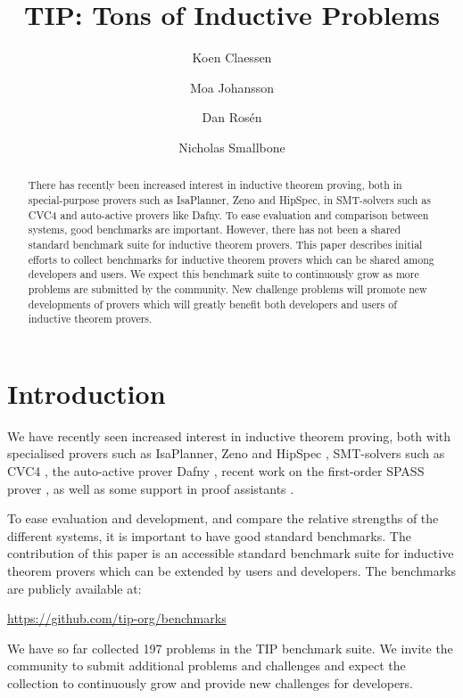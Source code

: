 \documentclass{llncs}
\begin{document}
\title{TIP: Tons of Inductive Problems}

\author{Koen Claessen \and Moa Johansson \and Dan Ros\'en \and Nicholas Smallbone}

\titlerunning{}

\maketitle

\begin{abstract}
There has recently been increased interest in inductive theorem
proving, both in special-purpose provers such as
IsaPlanner, Zeno and HipSpec, in SMT-solvers such as
CVC4 and auto-active provers like Dafny. To ease evaluation and comparison between systems,
good benchmarks are important. However, there has not been a shared
standard benchmark suite for inductive theorem provers. This paper
describes initial efforts to collect benchmarks for inductive theorem
provers which can be shared among developers and users.
We expect this benchmark suite to continuously grow as
more problems are submitted by the community. New challenge problems
will promote new developments of provers which will greatly benefit
both developers and users of inductive theorem provers.

\end{abstract}

\section{Introduction}

We have recently seen increased interest in inductive theorem proving, both with specialised provers such as IsaPlanner, Zeno and HipSpec \cite{hipspecCADE,dixon2007isaplanner,zeno}, SMT-solvers such as CVC4 \cite{cvc4}, the auto-active prover Dafny \cite{dafny}, recent work on the first-order SPASS prover \cite{SPASSInduction}, as well as some support in proof assistants \cite{hipster,acl2}.

To ease evaluation and development, and compare the relative strengths of the different systems, it is important to have good standard benchmarks. The contribution of this paper is an accessible standard benchmark suite for inductive theorem provers which can be extended by users and developers. The benchmarks are publicly available at:
\begin{center}
\url{https://github.com/tip-org/benchmarks}
\end{center}
We have so far collected 197 problems in the TIP benchmark suite. We invite the community to submit additional problems and challenges and expect the collection to continuously grow and provide new challenges for developers.
\end{document}
